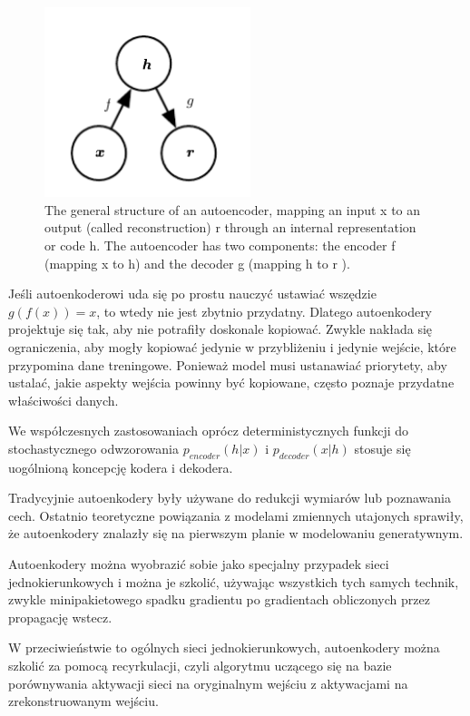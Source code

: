 \documentclass[12pt]{mwbk}
\theoremstyle{plain}
\theoremstyle{definition}
\theoremstyle{remark}
\newcommand\zrodlo[1]{\par\vspace{-3mm}{\small\textit{Źródło: }#1 }}
\begin{document}
\begin{figure}[!h]
	\centering
	\includegraphics[width=6cm]{rys/autoencoder_structure.png}
	\caption{The general structure of an autoencoder, mapping an input x to an output
		(called reconstruction) r through an internal representation or code h. The autoencoder
		has two components: the encoder f (mapping x to h) and the decoder g (mapping h
		to r ).}
	\zrodlo{\cite{goodfellow}}
	\label{fig:autoencoder_structue}
\end{figure}

Jeśli autoenkoderowi uda się po prostu nauczyć ustawiać wszędzie $g(f(x))=x$, to wtedy nie jest zbytnio przydatny. Dlatego autoenkodery projektuje się tak, aby nie potrafiły doskonale kopiować. Zwykle nakłada się ograniczenia, aby mogły kopiować jedynie w przybliżeniu i jedynie wejście, które przypomina dane treningowe. Ponieważ model musi ustanawiać priorytety, aby ustalać, jakie aspekty wejścia powinny być kopiowane, często poznaje przydatne właściwości danych.

We współczesnych zastosowaniach oprócz deterministycznych funkcji do stochastycznego odwzorowania $p_{encoder}(h|x)$ i $p_{decoder}(x|h)$ stosuje się uogólnioną koncepcję kodera i dekodera.

Tradycyjnie autoenkodery były używane do redukcji wymiarów lub poznawania cech. Ostatnio teoretyczne powiązania z modelami zmiennych utajonych sprawiły, że autoenkodery znalazły się na pierwszym planie w modelowaniu generatywnym.

Autoenkodery można wyobrazić sobie jako specjalny przypadek sieci jednokierunkowych i można je szkolić, używając wszystkich tych samych technik, zwykle minipakietowego spadku gradientu po gradientach obliczonych przez propagację wstecz.

W przeciwieństwie to ogólnych sieci jednokierunkowych, autoenkodery można szkolić za pomocą recyrkulacji, czyli algorytmu uczącego się na bazie porównywania aktywacji sieci na oryginalnym wejściu z aktywacjami na zrekonstruowanym wejściu. 
\end{document}
